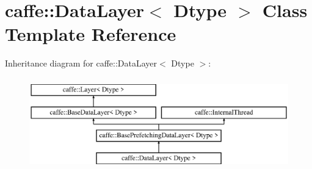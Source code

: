 \hypertarget{classcaffe_1_1DataLayer}{}\section{caffe\+:\+:Data\+Layer$<$ Dtype $>$ Class Template Reference}
\label{classcaffe_1_1DataLayer}
Inheritance diagram for caffe\+:\+:Data\+Layer$<$ Dtype $>$\+:\begin{figure}[H]
\begin{center}
\leavevmode
\includegraphics[height=4.000000cm]{classcaffe_1_1DataLayer}
\end{center}
\end{figure}

